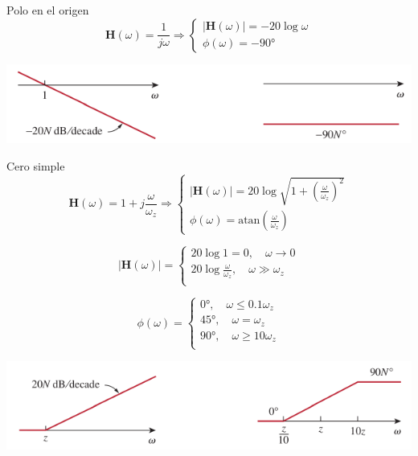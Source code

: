 \documentclass[xcolor={usenames,svgnames,dvipsnames}]{beamer}
\newcommand{\fasor}[1]{\mathbf{#1}(\omega)}
\newcommand{\atan}{\mathrm{atan}}
\begin{document}
\begin{frame}[label={sec:org13f097d}]{Polo en el origen}
\[
  \fasor{H} = \frac{1}{j\omega} \Rightarrow
  \begin{cases}
    |\fasor{H}| = - 20 \log \omega\\
    \phi(\omega) = - \ang{90}
  \end{cases}
\]

\begin{center}
\includegraphics[width=.9\linewidth]{../figs/BodePoloOrigen.pdf}
\end{center}
\end{frame}

\begin{frame}[label={sec:orge8f6003}]{Cero simple}
\[
  \fasor{H} = 1 + j\frac{\omega}{\omega_z} \Rightarrow
  \begin{cases}
    |\fasor{H}| =  20 \log \sqrt{1 + \left(\frac{\omega}{\omega_z}\right)^2}\\
    \phi(\omega) = \atan(\frac{\omega}{\omega_z}) 
  \end{cases}
\]

\[
  |\fasor{H}| = 
  \begin{cases}
  20 \log 1 = 0, \quad \omega \to 0\\
  20 \log \frac{\omega}{\omega_z}, \quad \omega \gg \omega_z\\
  \end{cases}
\]

\[
  \phi(\omega) = 
  \begin{cases}
    \ang{0},\quad \omega \leq 0.1\omega_z\\
    \ang{45}, \quad \omega = \omega_z\\
    \ang{90}, \quad \omega \geq 10\omega_z\\
  \end{cases}
\]

\begin{center}
\includegraphics[width=.9\linewidth]{../figs/BodeCeroSimple.pdf}
\end{center}
\end{frame}
\end{document}
